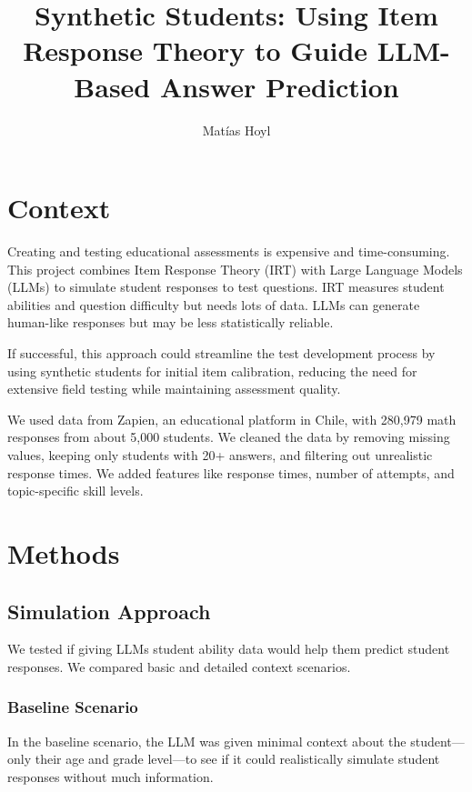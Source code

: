 \documentclass[
    a4paper, %
    10pt, %
    twoside %
]{LTJournalArticle}
\title{\Large Synthetic Students: Using Item Response Theory to Guide LLM-Based Answer Prediction}
\author{%
    Matías Hoyl
}
\begin{document}
\maketitle

\section{Context}
Creating and testing educational assessments is expensive and time-consuming. This project combines Item Response Theory (IRT) with Large Language Models (LLMs) to simulate student responses to test questions. IRT measures student abilities and question difficulty but needs lots of data. LLMs can generate human-like responses but may be less statistically reliable.

If successful, this approach could streamline the test development process by using synthetic students for initial item calibration, reducing the need for extensive field testing while maintaining assessment quality.

We used data from Zapien, an educational platform in Chile, with 280,979 math responses from about 5,000 students. We cleaned the data by removing missing values, keeping only students with 20+ answers, and filtering out unrealistic response times. We added features like response times, number of attempts, and topic-specific skill levels.

\section{Methods}

\subsection{Simulation Approach}
We tested if giving LLMs student ability data would help them predict student responses. We compared basic and detailed context scenarios.

\subsubsection{Baseline Scenario}
In the baseline scenario, the LLM was given minimal context about the student—only their age and grade level—to see if it could realistically simulate student responses without much information.
\end{document}

